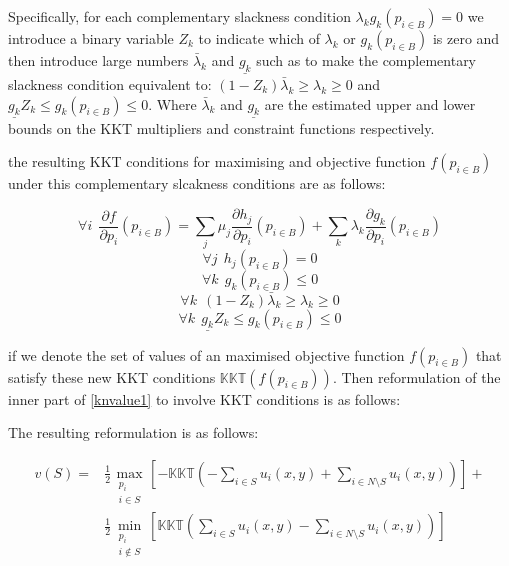 Specifically, for each complementary slackness condition $\lambda_kg_k(p_{i\in B}) = 0$ we introduce a binary variable $Z_k$ to indicate which of $\lambda_k$ or $g_k(p_{i\in B})$ is zero and then introduce large numbers $\bar{\lambda}_k$ and $ \underline{g_k} $ such as to make the complementary slackness condition equivalent to: $(1-Z_k)\bar{\lambda}_k \ge \lambda_k \ge 0$ and $\underline{g_k}Z_k\le g_k(p_{i\in B})\le 0$.
Where $\bar{\lambda}_k$ and $\underline{g_k}$ are the estimated upper and lower bounds on the KKT multipliers and constraint functions respectively.

the resulting KKT conditions for maximising and objective function $f(p_{i\in B})$ under this complementary slcakness conditions are as follows:

\begin{equation}\forall i~~\frac{\partial f}{\partial p_i}(p_{i\in B})=\sum_j\mu_j\frac{\partial h_j}{\partial p_i}(p_{i\in B}) + \sum_k\lambda_k\frac{\partial g_k}{\partial p_i}(p_{i\in B})\end{equation}
\begin{equation}\forall j~~ h_j(p_{i\in B})=0\end{equation}
\begin{equation}\forall k~~ g_k(p_{i\in B})\le 0\end{equation}
\begin{equation}\forall k~~ (1-Z_k)\bar{\lambda}_k \ge \lambda_k \ge 0\end{equation}
\begin{equation}\forall k~~ \underline{g_k}Z_k\le g_k(p_{i\in B}) \le 0\end{equation}

if we denote the set of values of an maximised objective function $f(p_{i\in B})$ that satisfy these new KKT conditions $\mathbb{KKT}(f(p_{i\in B}))$.
Then reformulation of the inner part of \eqref{knvalue1} to involve KKT conditions is as follows:

The resulting reformulation is as follows:

\begin{equation}
\label{optimization_eq1}
\begin{aligned}
v(S) =
&\frac{1}{2}\max_{\substack{p_i \\ i\in S}}   \left[-\mathbb{KKT}\left(-\sum_{i\in S} u_i(x,y) + \sum_{i\in N\setminus S}u_i(x,y)\right)\right] +\\
&\frac{1}{2}\min_{\substack{p_i \\ i\notin S}}\left[\mathbb{KKT}\left(\sum_{i\in S} u_i(x,y) - \sum_{i\in N\setminus S}u_i(x,y)\right)\right]
\end{aligned}
\end{equation}

